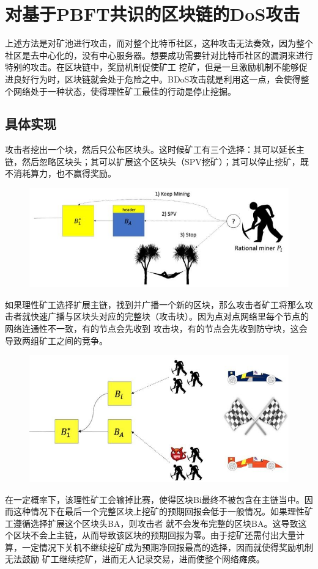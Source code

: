 \documentclass[UTF8,12pt]{article}
\begin{document}
\section{对基于PBFT共识的区块链的DoS攻击}
上述方法是对矿池进行攻击，而对整个比特币社区，这种攻击无法奏效，因为整个社区是去中心化的，没有中心服务器。想要成功需要针对比特币社区的漏洞来进行特别的攻击。在区块链中，奖励机制促使矿工
挖矿，但是一旦激励机制不能够促进良好行为时，区块链就会处于危险之中。BDoS攻击就是利用这一点，会使得整个网络处于一种状态，使得理性矿工最佳的行动是停止挖掘。
\subsection{具体实现}
攻击者挖出一个块，然后只公布区块头。这时候矿工有三个选择：其可以延长主链，然后忽略区块头；其可以扩展这个区块头（SPV挖矿）；其可以停止挖矿，既不消耗算力，也不赢得奖励。
\begin{figure}[H]
    \centering
    \includegraphics[width = 0.8 \textwidth]{choices.jpg}
\end{figure}
如果理性矿工选择扩展主链，找到并广播一个新的区块，那么攻击者矿工将那么攻击者就快速广播与区块头对应的完整块（攻击块）。因为点对点网络里每个节点的网络连通性不一致，有的节点会先收到
攻击块，有的节点会先收到防守块，这会导致两组矿工之间的竞争。
\begin{figure}[H]
    \centering
    \includegraphics[width = 0.8 \textwidth]{compete.jpg}
\end{figure}
在一定概率下，该理性矿工会输掉比赛，使得区块Bi最终不被包含在主链当中。因而这种情况下在最后一个完整区块上挖矿的预期回报会低于一般情况。如果理性矿工遵循选择扩展这个区块头BA，则攻击者
就不会发布完整的区块BA。这导致这个区块不会上主链，从而导致该区块的预期回报为零。由于挖矿还需付出大量计算，一定情况下关机不继续挖矿成为预期净回报最高的选择，因而就使得奖励机制无法鼓励
矿工继续挖矿，进而无人记录交易，进而使整个网络瘫痪。
\end{document}
